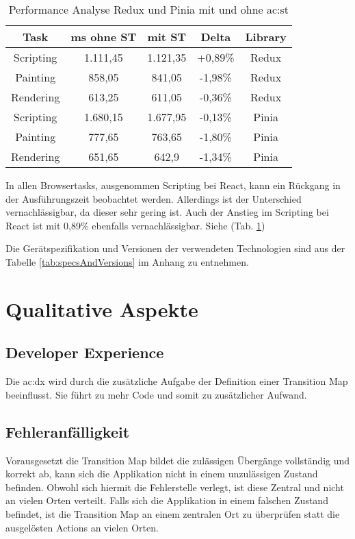 \begin{table}[!ht]
  \caption{Performance Analyse Redux und Pinia mit und ohne \acrshort{ac:st}}
  \label{tab:performanceAnalysisSTvsNoST}

  \begin{center}
    \begin{tabular}{|c|c|c|c|c|} 
    \hline
    Task & ms ohne ST & mit ST & Delta & Library \\ [0.5ex]
    \hline\hline
    Scripting & 1.111,45 & 1.121,35 & +0,89\% & Redux \\
    \hline
    Painting & 858,05 & 841,05 & -1,98\% & Redux \\
    \hline
    Rendering & 613,25 & 611,05 & -0,36\% & Redux \\
    \hline
    Scripting & 1.680,15 & 1.677,95 & -0,13\% & Pinia \\
    \hline
    Painting & 777,65 & 763,65 & -1,80\% & Pinia \\
    \hline
    Rendering & 651,65 & 642,9 & -1,34\% & Pinia \\
    \hline
    \end{tabular}
  \end{center}
\end{table}

In allen Browsertasks, ausgenommen Scripting bei React, kann ein Rückgang in der Ausführungszeit beobachtet werden. Allerdings ist der Unterschied vernachlässigbar, da dieser sehr gering ist. Auch der Anstieg im Scripting bei React ist mit 0,89\% ebenfalls vernachlässigbar. Siehe (Tab. \ref{tab:performanceAnalysisSTvsNoST})

Die Gerätspezifikation und Versionen der verwendeten Technologien sind aus der Tabelle \ref{tab:specsAndVersions} im Anhang zu entnehmen.

\section{Qualitative Aspekte}

\subsection{Developer Experience}
Die \acrshort{ac:dx} wird durch die zusätzliche Aufgabe der Definition einer Transition Map beeinflusst. Sie führt zu mehr Code und somit zu zusätzlicher Aufwand.

\subsection{Fehleranfälligkeit}
Vorausgesetzt die Transition Map bildet die zulässigen Übergänge vollständig und korrekt ab, kann sich die Applikation nicht in einem unzulässigen Zustand befinden. Obwohl sich hiermit die Fehlerstelle verlegt, ist diese Zentral und nicht an vielen Orten verteilt. Falls sich die Applikation in einem falschen Zustand befindet, ist die Transition Map an einem zentralen Ort zu überprüfen statt die ausgelösten Actions an vielen Orten.

